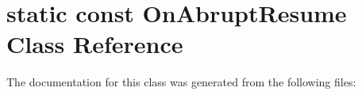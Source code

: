\hypertarget{classstatic_01const_01OnAbruptResume}{}\section{static const On\+Abrupt\+Resume Class Reference}
\label{classstatic_01const_01OnAbruptResume}


The documentation for this class was generated from the following files\+: